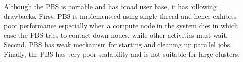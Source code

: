 Although the PBS is portable and has broad user base, it has following drawbacks.
First, PBS is implementted using single thread and hence exhibits poor performance
especially when a compute node in the system dies in which case the PBS
tries to contact down nodes, while other activities must wait. Second, PBS
has weak mechanism for starting and cleaning up parallel jobs. Finally, the PBS
has very poor scalability and is not suitable for large clusters.
